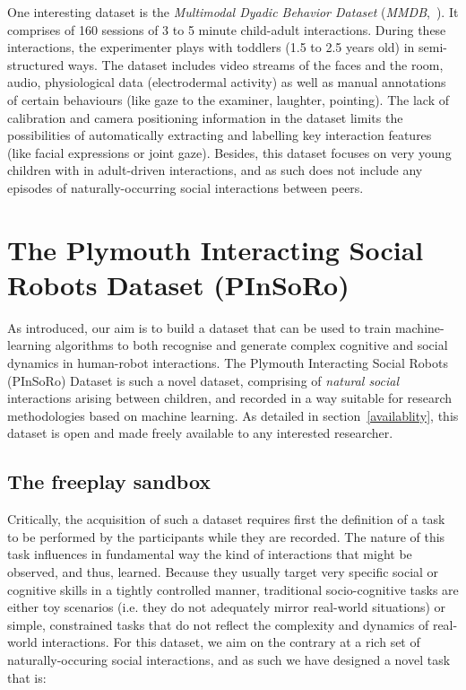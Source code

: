 \documentclass{article}
\newcommand{\ie}{i.e.\xspace}
\begin{document}
One interesting dataset is the \emph{Multimodal Dyadic Behavior
Dataset} (\emph{MMDB},~\cite{rehg2013decoding}). It comprises of 160 sessions of
3 to 5 minute child-adult interactions. During these interactions, the
experimenter plays with toddlers (1.5 to 2.5 years old) in semi-structured ways.
The dataset includes video streams of the faces and the room, audio, physiological data
(electrodermal activity) as well as manual annotations of certain behaviours
(like gaze to the examiner, laughter, pointing). The lack of calibration and camera positioning
information in the dataset limits the possibilities of automatically extracting and
labelling key interaction features (like facial expressions or joint gaze). Besides,
this dataset focuses on very young children with in adult-driven interactions,
and as such does not include any episodes of naturally-occurring social
interactions between peers.


\section{The Plymouth Interacting Social Robots Dataset (PInSoRo)}


As introduced, our aim is to build a dataset that can be used to train
machine-learning algorithms to both recognise and generate complex cognitive and
social dynamics in human-robot interactions. The Plymouth Interacting Social
Robots (PInSoRo) Dataset is such a novel dataset, comprising of \emph{natural
social} interactions arising between children, and recorded in a way suitable
for research methodologies based on machine learning. As detailed in
section~\ref{availablity}, this dataset is open and made freely available to any
interested researcher.


\subsection{The freeplay sandbox}

Critically, the acquisition of such a dataset requires first the definition of a
task to be performed by the participants while they are recorded. The nature of
this task influences in fundamental way the kind of interactions that might be
observed, and thus, learned.  Because they usually target very specific social
or cognitive skills in a tightly controlled manner, traditional socio-cognitive tasks are
either toy scenarios (\ie they do not adequately mirror real-world situations)
or simple, constrained tasks that do not reflect the complexity and dynamics of
real-world interactions. For this dataset, we aim on the contrary at a rich set
of naturally-occuring social interactions, and as such we have designed a novel
task that is:
\end{document}
